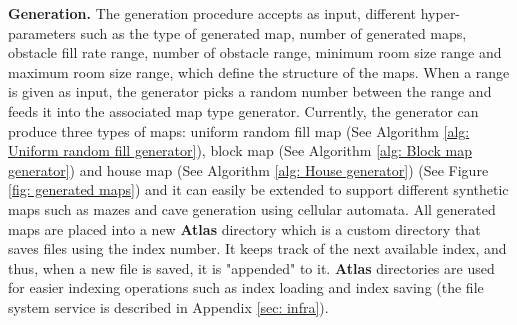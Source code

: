 

\textbf{Generation.} The generation procedure accepts as input, different hyper-parameters such as the type of generated map, number of generated maps, obstacle fill rate range, number of obstacle range, minimum room size range and maximum room size range, which define the structure of the maps. When a range is given as input, the generator picks a random number between the range and feeds it into the associated map type generator. Currently, the generator can produce three types of maps: uniform random fill map (See Algorithm \ref{alg: Uniform random fill generator}), block map (See Algorithm \ref{alg: Block map generator}) and house map (See Algorithm \ref{alg: House generator}) (See Figure \ref{fig: generated maps}) and it can easily be extended to support different synthetic maps such as mazes and cave generation using cellular automata. All generated maps are placed into a new \textbf{Atlas} directory which is a custom directory that saves files using the index number. It keeps track of the next available index, and thus, when a new file is saved, it is "appended" to it. \textbf{Atlas} directories are used for easier indexing operations such as index loading and index saving (the file system service is described in Appendix \ref{sec: infra}).

